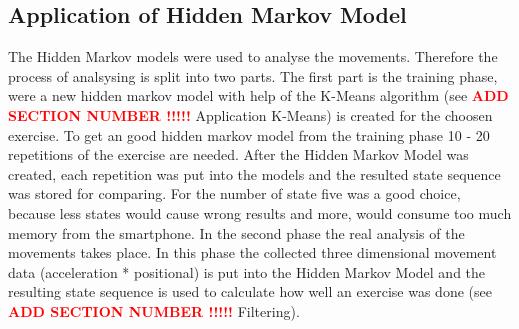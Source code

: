 \subsection{Application of Hidden Markov Model}

The Hidden Markov models were used to analyse the movements. Therefore the process of analsysing is split into two parts. The first part is the training phase, were a new hidden markov model with help of the K-Means algorithm (see  \textcolor{red}{\textbf{ ADD SECTION NUMBER !!!!!}} Application K-Means) is created for the choosen exercise. To get an good hidden markov model from the training phase 10 - 20 repetitions of the exercise are needed. After the Hidden Markov Model was created, each repetition was put into the models and the resulted state sequence was stored for comparing. For the number of state five was a good choice, because less states would cause wrong results and more, would consume too much memory from the smartphone. In the second phase the real analysis of the movements takes place. In this phase the collected three dimensional movement data (acceleration * positional) is put into the Hidden Markov Model and the resulting state sequence is used to calculate how well an exercise was done (see \textcolor{red}{\textbf{ ADD SECTION NUMBER !!!!!}} Filtering).

